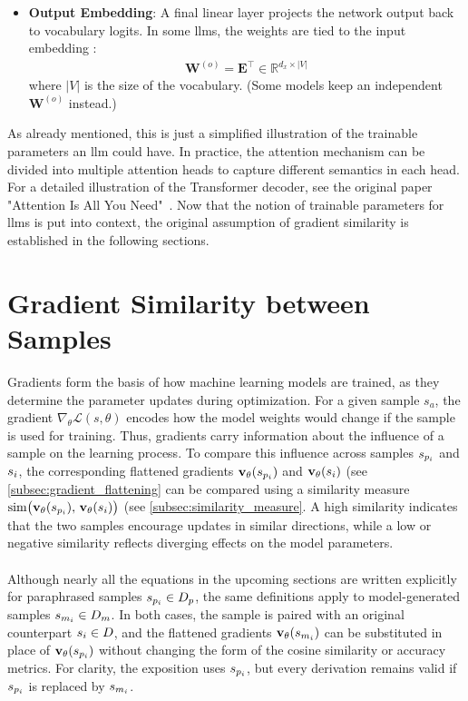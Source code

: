 \begin{itemize}
    \item \textbf{Output Embedding}: A final linear layer projects the network output back to vocabulary logits. In some \acrshort{llm}s, the weights are tied to the input embedding \cite{DBLP:conf/eacl/PressW17}:
          \begin{align*}
              \mathbf{W}^{(o)}=\mathbf{E}^{\top}\in\mathbb{R}^{d_x \times |V|}
          \end{align*}
          where $|V|$ is the size of the vocabulary. (Some models keep an independent $\mathbf{W}^{(o)}$ instead.)
\end{itemize}
As already mentioned, this is just a simplified illustration of the trainable parameters an \acrshort{llm} could have. In practice, the attention mechanism can be divided into multiple attention heads to capture different semantics in each head. For a detailed illustration of the Transformer decoder, see the original paper "Attention Is All You Need"~\cite{DBLP:conf/nips/VaswaniSPUJGKP17}. Now that the notion of trainable parameters for \acrlong{llm}s is put into context, the original assumption of gradient similarity is established in the following sections.

\section{Gradient Similarity between Samples}\label{sec:gradient_similarity_between_samples}
Gradients form the basis of how machine learning models are trained, as they determine the parameter updates during optimization. For a given sample $s_a$, the gradient $\nabla_{\theta}\mathcal{L}(s,\theta)$ encodes how the model weights would change if the sample is used for training. Thus, gradients carry information about the influence of a sample on the learning process. To compare this influence across samples $\spi$ and $\si$, the corresponding flattened gradients $\vXspi[\theta]$ and $\vXsi[\theta]$ (see \autoref{subsec:gradient_flattening} can be compared using a similarity measure $\operatorname{sim}\bigl(\vXspi[\theta],\,\vXsi[\theta]\bigr)$ (see \autoref{subsec:similarity_measure}. A high similarity indicates that the two samples encourage updates in similar directions, while a low or negative similarity reflects diverging effects on the model parameters.
\\\\
Although nearly all the equations in the upcoming sections are written explicitly for paraphrased samples $\spi \in D_p$, the same definitions apply to model-generated samples $\smi \in D_m$. In both cases, the sample is paired with an original counterpart $\si \in D$, and the flattened gradients $\vXsmi[\theta]$ can be substituted in place of $\vXspi[\theta]$ without changing the form of the cosine similarity or accuracy metrics. For clarity, the exposition uses $\spi$, but every derivation remains valid if $\spi$ is replaced by $\smi$.

